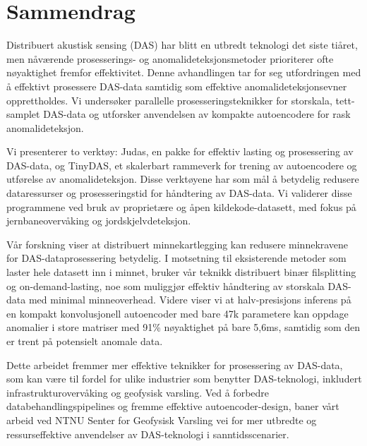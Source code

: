 \chapter*{Sammendrag}
Distribuert akustisk sensing (DAS) har blitt en utbredt teknologi det siste tiåret, men nåværende prosesserings- og anomalideteksjonsmetoder prioriterer ofte nøyaktighet fremfor effektivitet. Denne avhandlingen tar for seg utfordringen med å effektivt prosessere DAS-data samtidig som effektive anomalideteksjonsevner opprettholdes. Vi undersøker parallelle prosesseringsteknikker for storskala, tett-samplet DAS-data og utforsker anvendelsen av kompakte autoencodere for rask anomalideteksjon.

Vi presenterer to verktøy: Judas, en pakke for effektiv lasting og prosessering av DAS-data, og TinyDAS, et skalerbart rammeverk for trening av autoencodere og utførelse av anomalideteksjon. Disse verktøyene har som mål å betydelig redusere dataressurser og prosesseringstid for håndtering av DAS-data. Vi validerer disse programmene ved bruk av proprietære og åpen kildekode-datasett, med fokus på jernbaneovervåking og jordskjelvdeteksjon.

Vår forskning viser at distribuert minnekartlegging kan redusere minnekravene for DAS-dataprosessering betydelig. I motsetning til eksisterende metoder som laster hele datasett inn i minnet, bruker vår teknikk distribuert binær filsplitting og on-demand-lasting, noe som muliggjør effektiv håndtering av storskala DAS-data med minimal minneoverhead. Videre viser vi at halv-presisjons inferens på en kompakt konvolusjonell autoencoder med bare 47k parametere kan oppdage anomalier i store matriser med 91\% nøyaktighet på bare 5,6ms, samtidig som den er trent på potensielt anomale data.

Dette arbeidet fremmer mer effektive teknikker for prosessering av DAS-data, som kan være til fordel for ulike industrier som benytter DAS-teknologi, inkludert infrastrukturovervåking og geofysisk varsling. Ved å forbedre databehandlingspipelines og fremme effektive autoencoder-design, baner vårt arbeid ved NTNU Senter for Geofysisk Varsling vei for mer utbredte og ressurseffektive anvendelser av DAS-teknologi i sanntidsscenarier.
